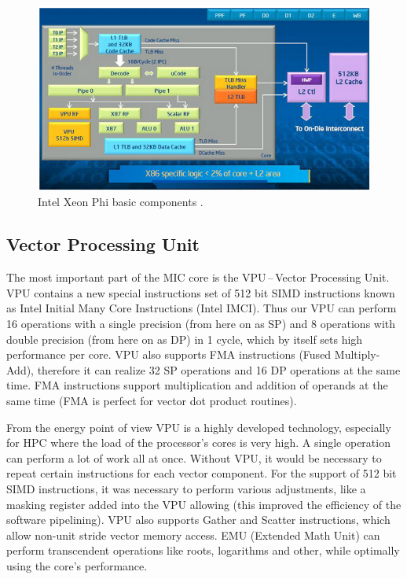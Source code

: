 \begin{figure}[htb]
    \centering
    \includegraphics[width=0.7\linewidth]{fig/phi_structure.png}
    \caption{Intel Xeon Phi basic components \cite{intel_phi_architecture}.}
    \label{fig:phi_structure}
\end{figure} 

\subsection{Vector Processing Unit}
The most important part of the MIC core is the VPU\,--\,Vector Processing Unit. VPU contains a new special instructions set of 512 bit SIMD instructions known as Intel Initial Many Core Instructions (Intel IMCI). Thus our VPU can perform 16 operations with a single precision (from here on as SP) and 8 operations with double precision (from here on as DP) in 1 cycle, which by itself sets high performance per core. VPU also supports FMA instructions (Fused Multiply-Add), therefore it can realize 32 SP operations and 16 DP operations at the same time. FMA instructions support multiplication and addition of operands at the same time (FMA is perfect for vector dot product routines).

\par From the energy point of view VPU is a highly developed technology, especially for HPC where the load of the processor's cores is very high. A single operation can perform a lot of work all at once. Without VPU, it would be necessary to repeat certain instructions for each vector component. For the support of 512 bit SIMD instructions, it was necessary to perform various adjustments, like a masking register added into the VPU allowing  (this improved the efficiency of the software pipelining). VPU also supports Gather and Scatter instructions, which allow non-unit stride vector memory access. EMU (Extended Math Unit) can perform transcendent operations like roots, logarithms and other, while optimally using the core's performance.

